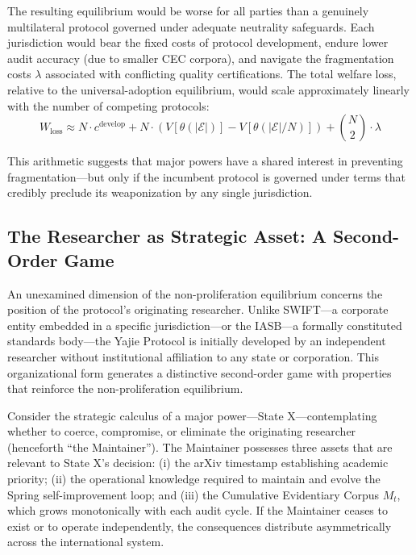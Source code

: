 \documentclass[12pt,a4paper]{ctexart}
\theoremstyle{definition}
\theoremstyle{remark}
\begin{document}
The resulting equilibrium would be worse for all parties than a genuinely multilateral protocol governed under adequate neutrality safeguards. Each jurisdiction would bear the fixed costs of protocol development, endure lower audit accuracy (due to smaller CEC corpora), and navigate the fragmentation costs $\lambda$ associated with conflicting quality certifications. The total welfare loss, relative to the universal-adoption equilibrium, would scale approximately linearly with the number of competing protocols:
\begin{equation}
W_{\text{loss}} \approx N \cdot c^{\text{develop}} + N \cdot (V[\theta(|\mathcal{E}|)] - V[\theta(|\mathcal{E}|/N)]) + \binom{N}{2} \cdot \lambda
\end{equation}

This arithmetic suggests that major powers have a shared interest in preventing fragmentation—but only if the incumbent protocol is governed under terms that credibly preclude its weaponization by any single jurisdiction.

\subsection{The Researcher as Strategic Asset: A Second-Order Game}

An unexamined dimension of the non-proliferation equilibrium concerns the position of the protocol's originating researcher. Unlike SWIFT—a corporate entity embedded in a specific jurisdiction—or the IASB—a formally constituted standards body—the Yajie Protocol is initially developed by an independent researcher without institutional affiliation to any state or corporation. This organizational form generates a distinctive second-order game with properties that reinforce the non-proliferation equilibrium.

Consider the strategic calculus of a major power—State X—contemplating whether to coerce, compromise, or eliminate the originating researcher (henceforth ``the Maintainer''). The Maintainer possesses three assets that are relevant to State X's decision: (i) the arXiv timestamp establishing academic priority; (ii) the operational knowledge required to maintain and evolve the Spring self-improvement loop; and (iii) the Cumulative Evidentiary Corpus $M_t$, which grows monotonically with each audit cycle. If the Maintainer ceases to exist or to operate independently, the consequences distribute asymmetrically across the international system.
\end{document}
